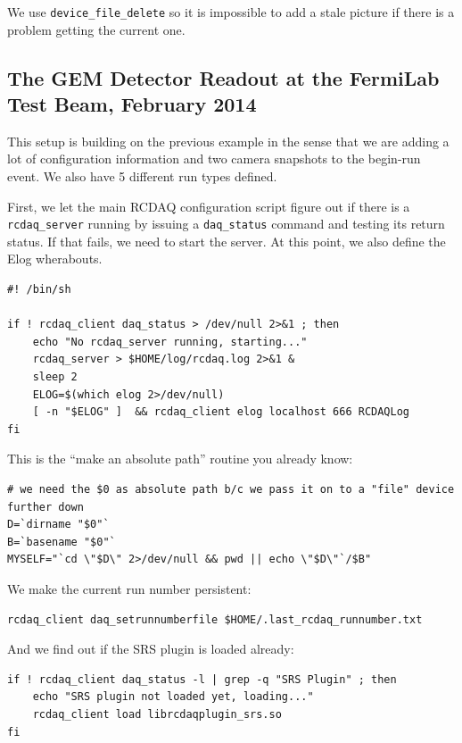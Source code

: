 \documentclass{article}[11pt]
\begin{document}
We use \verb|device_file_delete| so it is impossible to add a stale
picture if there is a problem getting the current one.

\subsection{The GEM Detector Readout at the FermiLab Test Beam, February 2014}

This setup is building on the previous example in the sense that 
we are adding a lot of configuration information and two camera 
snapshots to the begin-run event. We also have 5 different run types defined.

First, we let the main RCDAQ configuration script figure out if there
is a \verb|rcdaq_server| running by issuing a \verb|daq_status|
command and testing its return status. If that fails, we need to start
the server. At this point, we also define the Elog wherabouts.

\begin{verbatim} 
#! /bin/sh

if ! rcdaq_client daq_status > /dev/null 2>&1 ; then
    echo "No rcdaq_server running, starting..."
    rcdaq_server > $HOME/log/rcdaq.log 2>&1 &
    sleep 2
    ELOG=$(which elog 2>/dev/null)
    [ -n "$ELOG" ]  && rcdaq_client elog localhost 666 RCDAQLog
fi
\end{verbatim} 

This is the ``make an absolute path'' routine you already know:

\begin{verbatim} 
# we need the $0 as absolute path b/c we pass it on to a "file" device further down
D=`dirname "$0"`
B=`basename "$0"`
MYSELF="`cd \"$D\" 2>/dev/null && pwd || echo \"$D\"`/$B"
\end{verbatim} 

We make the current run number persistent:

\begin{verbatim} 
rcdaq_client daq_setrunnumberfile $HOME/.last_rcdaq_runnumber.txt
\end{verbatim} 

And we find out if the SRS plugin is loaded already:

\begin{verbatim} 
if ! rcdaq_client daq_status -l | grep -q "SRS Plugin" ; then
    echo "SRS plugin not loaded yet, loading..."
    rcdaq_client load librcdaqplugin_srs.so
fi
\end{verbatim} 
\end{document}
